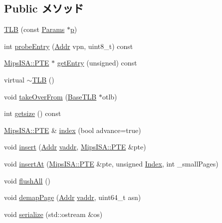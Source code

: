 \subsection*{Public メソッド}
\begin{DoxyCompactItemize}
\item 
\hyperlink{classMipsISA_1_1TLB_acb886bd3c59f00c21be9ceaaf25dab97}{TLB} (const \hyperlink{classMipsISA_1_1TLB_a8fcac7e147ea0cf7183de360adcb6efe}{Params} $\ast$\hyperlink{namespaceMipsISA_a37d3f683959086eac7bcf24a002a9fb8}{p})
\item 
int \hyperlink{classMipsISA_1_1TLB_a4dd1511c095e58173f0f7b78eeded1fe}{probeEntry} (\hyperlink{classm5_1_1params_1_1Addr}{Addr} vpn, uint8\_\-t) const 
\item 
\hyperlink{structMipsISA_1_1PTE}{MipsISA::PTE} $\ast$ \hyperlink{classMipsISA_1_1TLB_a037665357bdcc33c860434de97a7e439}{getEntry} (unsigned) const 
\item 
virtual \hyperlink{classMipsISA_1_1TLB_a18a1722ab7889997b15fd7b9fc33c7ff}{$\sim$TLB} ()
\item 
void \hyperlink{classMipsISA_1_1TLB_a15b6c15c1be2ca4de3e65772a02aa29f}{takeOverFrom} (\hyperlink{classBaseTLB}{BaseTLB} $\ast$otlb)
\item 
int \hyperlink{classMipsISA_1_1TLB_ae121404a6cfcf714e05fe2231ce4c7fc}{getsize} () const 
\item 
\hyperlink{structMipsISA_1_1PTE}{MipsISA::PTE} \& \hyperlink{classMipsISA_1_1TLB_ad4b919b0718938b6a12952a6d5fc658e}{index} (bool advance=true)
\item 
void \hyperlink{classMipsISA_1_1TLB_a3e394e68b30bef38db30203d2e4324d8}{insert} (\hyperlink{classm5_1_1params_1_1Addr}{Addr} \hyperlink{namespaceMipsISA_ac78d9788b3f9a366df64485c9afaf1b1}{vaddr}, \hyperlink{structMipsISA_1_1PTE}{MipsISA::PTE} \&pte)
\item 
void \hyperlink{classMipsISA_1_1TLB_ac8f8f13ac6850d331b331f6ed7fed5c8}{insertAt} (\hyperlink{structMipsISA_1_1PTE}{MipsISA::PTE} \&pte, unsigned \hyperlink{TypeDefines_8hh_a39642de41f3574937f399f4fab25ba18}{Index}, int \_\-smallPages)
\item 
void \hyperlink{classMipsISA_1_1TLB_aca1483a67aee5a91e442f7131d66bcbd}{flushAll} ()
\item 
void \hyperlink{classMipsISA_1_1TLB_a2d698ff909513b48a1263f8a5440e067}{demapPage} (\hyperlink{classm5_1_1params_1_1Addr}{Addr} \hyperlink{namespaceMipsISA_ac78d9788b3f9a366df64485c9afaf1b1}{vaddr}, uint64\_\-t asn)
\item 
void \hyperlink{classMipsISA_1_1TLB_a53e036786d17361be4c7320d39c99b84}{serialize} (std::ostream \&os)

\end{DoxyCompactItemize}
